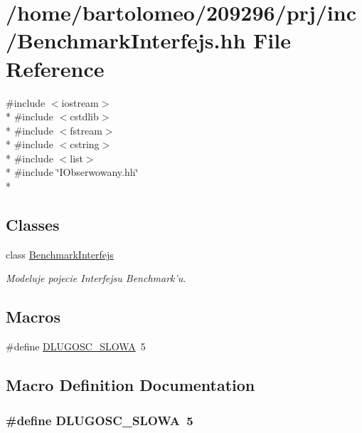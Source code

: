 \hypertarget{_benchmark_interfejs_8hh}{\section{/home/bartolomeo/209296/prj/inc/\-Benchmark\-Interfejs.hh File Reference}
\label{_benchmark_interfejs_8hh}
}
{\ttfamily \#include $<$iostream$>$}\\*
{\ttfamily \#include $<$cstdlib$>$}\\*
{\ttfamily \#include $<$fstream$>$}\\*
{\ttfamily \#include $<$cstring$>$}\\*
{\ttfamily \#include $<$list$>$}\\*
{\ttfamily \#include \char`\"{}I\-Obserwowany.\-hh\char`\"{}}\\*
\subsection*{Classes}
\begin{DoxyCompactItemize}
\item 
class \hyperlink{class_benchmark_interfejs}{Benchmark\-Interfejs}
\begin{DoxyCompactList}\small\item\em Modeluje pojecie Interfejsu Benchmark'u. \end{DoxyCompactList}\end{DoxyCompactItemize}
\subsection*{Macros}
\begin{DoxyCompactItemize}
\item 
\#define \hyperlink{_benchmark_interfejs_8hh_ac6d08416f5bf3ac9d0a6c16e4885128c}{D\-L\-U\-G\-O\-S\-C\-\_\-\-S\-L\-O\-W\-A}~5
\end{DoxyCompactItemize}


\subsection{Macro Definition Documentation}
\hypertarget{_benchmark_interfejs_8hh_ac6d08416f5bf3ac9d0a6c16e4885128c}{
\subsubsection[{D\-L\-U\-G\-O\-S\-C\-\_\-\-S\-L\-O\-W\-A}]{\setlength{\rightskip}{0pt plus 5cm}\#define D\-L\-U\-G\-O\-S\-C\-\_\-\-S\-L\-O\-W\-A~5}}\label{_benchmark_interfejs_8hh_ac6d08416f5bf3ac9d0a6c16e4885128c}
